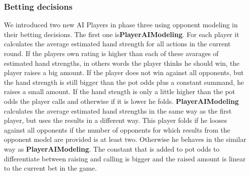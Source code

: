 \subsubsection{Betting decisions}

We introduced two new AI Players in phase three using opponent modeling in their betting decisions. The first one is\textbf{PlayerAIModeling}. For each player it calculates the average estimated hand strength for all actions in the current round. If the players own rating is higher than each of these avarages of estimated hand strengths, in others words the player thinks he should win, the player raises a big amount. If the player does not win against all opponents, but the hand strength is still bigger than the pot odds plus a constant summand, he raises a small amount. 
If the hand stength is only a little higher than the pot odds the player calls and otherwise if it is lower he folds.
\textbf{PlayerAIModeling} calculates the average estimated hand strengths in the same way as the first player, but uses the results in a different way. This player folds if he looses against all opponents if the number of opponents for which results from the opponent model are provided is at least two. Otherwise he behaves in the similar way as \textbf{PlayerAIModeling}. The constant that is added to pot odds to differentiate between raising and calling is bigger and the raised amount is linear to the current bet in the game. 



